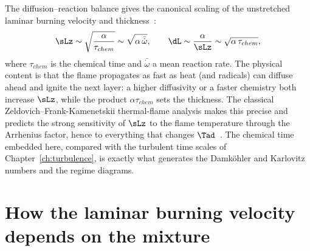 The diffusion--reaction balance gives the canonical scaling of the unstretched laminar burning velocity and thickness~\cite{lecture9,glassman2014combustion}:
\begin{equation}
\sLz\sim\sqrt{\frac{\alpha}{\tau_{chem}}}\sim\sqrt{\alpha\,\bar{\dot\omega}},\qquad
\dL\sim\frac{\alpha}{\sLz}\sim\sqrt{\alpha\,\tau_{chem}} ,
\label{eq:sL-scaling}
\end{equation}
where $\tau_{chem}$ is the chemical time and $\bar{\dot\omega}$ a mean reaction rate. The physical content is that the flame propagates as fast as heat (and radicals) can diffuse ahead and ignite the next layer: a higher diffusivity or a faster chemistry both increase $\sLz$, while the product $\alpha\tau_{chem}$ sets the thickness. The classical Zeldovich--Frank-Kamenetskii thermal-flame analysis makes this precise and predicts the strong sensitivity of $\sLz$ to the flame temperature through the Arrhenius factor, hence to everything that changes $\Tad$~\cite{glassman2014combustion,warnatz2006combustion}. The chemical time embedded here, compared with the turbulent time scales of Chapter~\ref{ch:turbulence}, is exactly what generates the Damk\"ohler and Karlovitz numbers and the regime diagrams.

\section{How the laminar burning velocity depends on the mixture}

